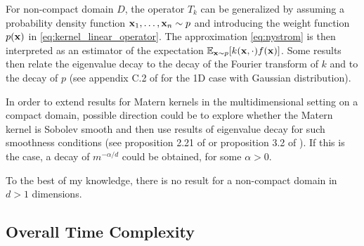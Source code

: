 \documentclass{article}
\begin{document}
{For non-compact domain $D$, the operator $T_k$ can be generalized by assuming a probability density function $\boldsymbol{\mathbf{x}}_1, \ldots, \boldsymbol{\mathbf{x}}_n \sim p$ and introducing the weight function $p(\boldsymbol{\mathbf{x}})$ in \eqref{eq:kernel_linear_operator}. The approximation \eqref{eq:nystrom} is then interpreted as an estimator of the expectation $\operatorname{\mathbb{E}}_{\boldsymbol{\mathbf{x}} \sim p}[k(\boldsymbol{\mathbf{x}}, \cdot) f(\boldsymbol{\mathbf{x}})]$. Some results then relate the eigenvalue decay to the decay of the Fourier transform of $k$ and to the decay of $p$ (see appendix C.2 of \cite{bach_kernel_2002} for the 1D case with Gaussian distribution).

In order to extend results for Matern kernels in the multidimensional setting on a compact domain, possible direction could be to explore whether the Matern kernel is Sobolev smooth and then use results of eigenvalue decay for such smoothness conditions (see proposition 2.21 of \cite{schwab_karhunenloeve_2006} or proposition 3.2 of \cite{todor_robust_2006}). If this is the case, a decay of $m^{-\alpha / d}$ could be obtained, for some $\alpha > 0$.

To the best of my knowledge, there is no result for a non-compact domain in $d > 1$ dimensions. 

\subsection{Overall Time Complexity}

}
\end{document}
